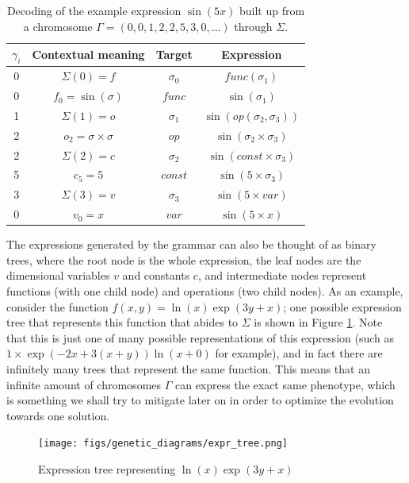\documentclass[aps,reprint,superscriptaddress,nofootinbib]{revtex4-2}
\begin{document}
\begin{table}[htp]
    \centering
    \caption{Decoding of the example expression \(\sin(5x)\) built up from a chromosome \(\Gamma = \left(0, 0, 1, 2, 2, 5, 3, 0, \ldots\right)\) through \(\Sigma\).}
    \begin{tabular}{c|c|c|c}
        \(\gamma_i\) & Contextual meaning & Target & Expression
        \\
        \hline 
        0 & \(\Sigma(0) = f\) & \(\sigma_0\) & \(func(\sigma_1)\)
        \\
        0 & \(f_0 = \sin(\sigma)\) & \(func\) & \(\sin(\sigma_1)\)
        \\
        1 & \(\Sigma(1) = o\) & \(\sigma_1\) & \(\sin(op(\sigma_2, \sigma_3))\)
        \\
        2 & \(o_2 = \sigma \times \sigma\) & \(op\) & \(\sin(\sigma_2 \times \sigma_3)\)
        \\
        2 & \(\Sigma(2) = c\) & \(\sigma_2\) & \(\sin(const \times \sigma_3)\)
        \\
        5 & \(c_5 = 5\) & \(const\) & \(\sin(5 \times \sigma_3)\)
        \\
        3 & \(\Sigma(3) = v\) & \(\sigma_3\) & \(\sin(5 \times var)\)
        \\
        0 & \(v_0 = x\) & \(var\) & \(\sin(5 \times x)\)
    \end{tabular}
    \label{tab:expr_example}
\end{table}

The expressions generated by the grammar can also be thought of as binary trees, where the root node is the whole expression, the leaf nodes are the dimensional variables \(v\) and constants \(c\), and intermediate nodes represent functions (with one child node) and operations (two child nodes). As an example, consider the function \(f(x, y) = \ln(x)\exp(3y+x)\); one possible expression tree that represents this function that abides to \(\Sigma\) is shown in Figure \ref{fig:expr_tree}. Note that this is just one of many possible representations of this expression (such as \(1\times\exp(-2x+3(x+y))\ln(x+0)\) for example), and in fact there are infinitely many trees that represent the same function. This means that an infinite amount of chromosomes \(\Gamma\) can express the exact same phenotype, which is something we shall try to mitigate later on in order to optimize the evolution towards one solution.

\begin{figure}[htp]
    \centering
    \texttt{[image: figs/genetic\_diagrams/expr\_tree.png]}
    \caption{Expression tree representing \(\ln(x)\exp(3y+x)\)}
    \label{fig:expr_tree}
\end{figure}
\end{document}
